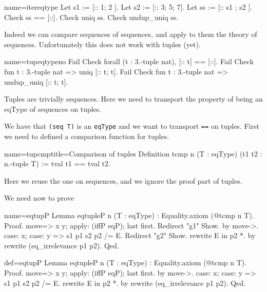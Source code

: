 \begin{coq}{name=itereqtype}{}
Let s1 := [:: 1; 2 ].
Let s2 := [:: 3; 5; 7].
Let ss := [:: s1 ; s2 ].
Check ss == [::].
Check uniq ss.
Check undup_uniq ss.
\end{coq}

Indeed we can compare sequences of sequences, and apply to them
the theory of sequences.
Unfortunately this does not work with tuples (yet).

\begin{coq}{name=tupeqtypeno}{}
Fail Check forall (t : 3.-tuple nat), [:: t] == [::].
Fail Check fun t : 3.-tuple nat => uniq [:: t; t].
Fail Check fun t : 3.-tuple nat => undup_uniq [:: t; t].
\end{coq}

Tuples are trivially sequences.  Here we need to transport the
property of being an eqType of sequences on tuples.


We have that \lstinline/(seq T)/ is an \lstinline/eqType/ and
we want to transport \lstinline/==/ on tuples.  First we need to
defined a comparison function for tuples.

\begin{coq}{name=tupcmp}{title=Comparison of tuples}
Definition tcmp n (T : eqType) (t1 t2 : n.-tuple T) :=
  tval t1 == tval t2.
\end{coq}

Here we reuse the one on sequences, and we ignore the
proof part of tuples.

We need now to prove

\begin{coqdef}{name=eqtupP}
Lemma eqtupleP n (T : eqType) : Equality.axiom (@tcmp n T).
Proof.
move=> x y; apply: (iffP eqP); last first.
Redirect "g1" Show.
  by move->.
case: x; case: y => s1 p1 s2 p2 /= E. Redirect "g2" Show.
rewrite E in p2 *.
by rewrite (eq_irrelevance p1 p2).
Qed.
\end{coqdef}
\begin{coq}{def=eqtupP}{}
Lemma eqtupleP n (T : eqType) : Equality.axiom (@tcmp n T).
Proof.
move=> x y; apply: (iffP eqP); last first.
  by move->.
case: x; case: y => s1 p1 s2 p2 /= E.
rewrite E in p2 *.
by rewrite (eq_irrelevance p1 p2).
Qed.
\end{coq}

